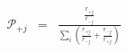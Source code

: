 \begin{eqnarray}
{\mathcal P}_{+j}  & = & \frac{\frac{r_{+j}}{r_{-j}}}{\sum_i\left(\frac{r_{+j}}{r_{-j}} + \frac{r_{-j}}{r_{+j}}  \right)} \\
\end{eqnarray}